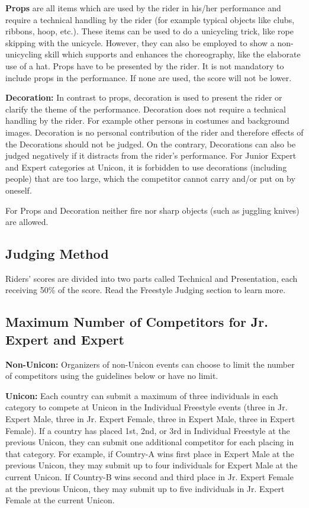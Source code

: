\textbf{Props} are all items which are used by the rider in his/her performance and require a technical handling by the rider (for example typical objects like clubs, ribbons, hoop, etc.). 
These items can be used to do a unicycling trick, like rope skipping with the unicycle.
However, they can also be employed to show a non-unicycling skill which supports and enhances the choreography, like the elaborate use of a hat.
Props have to be presented by the rider.
It is not mandatory to include props in the performance.
If none are used, the score will not be lower. 

\textbf{Decoration:} In contrast to props, decoration is used to present the rider or clarify the theme of the performance.
Decoration does not require a technical handling by the rider.
For example other persons in costumes and background images.
Decoration is no personal contribution of the rider and therefore effects of the Decorations should not be judged.
On the contrary, Decorations can also be judged negatively if it distracts from the rider’s performance.
For Junior Expert and Expert categories at Unicon, it is forbidden to use decorations (including people) that are too large, which the competitor cannot carry and/or put on by oneself. 

For Props and Decoration neither fire nor sharp objects (such as juggling knives) are allowed.

\subsection{Judging Method}
Riders' scores are divided into two parts called Technical and Presentation, each receiving 50\% of the score.
Read the Freestyle Judging section to learn more.

\subsection{Maximum Number of Competitors for Jr. Expert and Expert}
\textbf{Non-Unicon:} Organizers of non-Unicon events can choose to limit the number of competitors using the guidelines below or have no limit.

\textbf{Unicon:} Each country can submit a maximum of three individuals in each category to compete at Unicon in the Individual Freestyle events (three in Jr. Expert Male, three in Jr. Expert Female, three in Expert Male, three in Expert Female).
If a country has placed 1st, 2nd, or 3rd in Individual Freestyle at the previous Unicon, they can submit one additional competitor for each placing in that category.
For example, if Country-A wins first place in Expert Male at the previous Unicon, they may submit up to four individuals for Expert Male at the current Unicon.
If Country-B wins second and third place in Jr. Expert Female at the previous Unicon, they may submit up to five individuals in Jr. Expert Female at the current Unicon.

